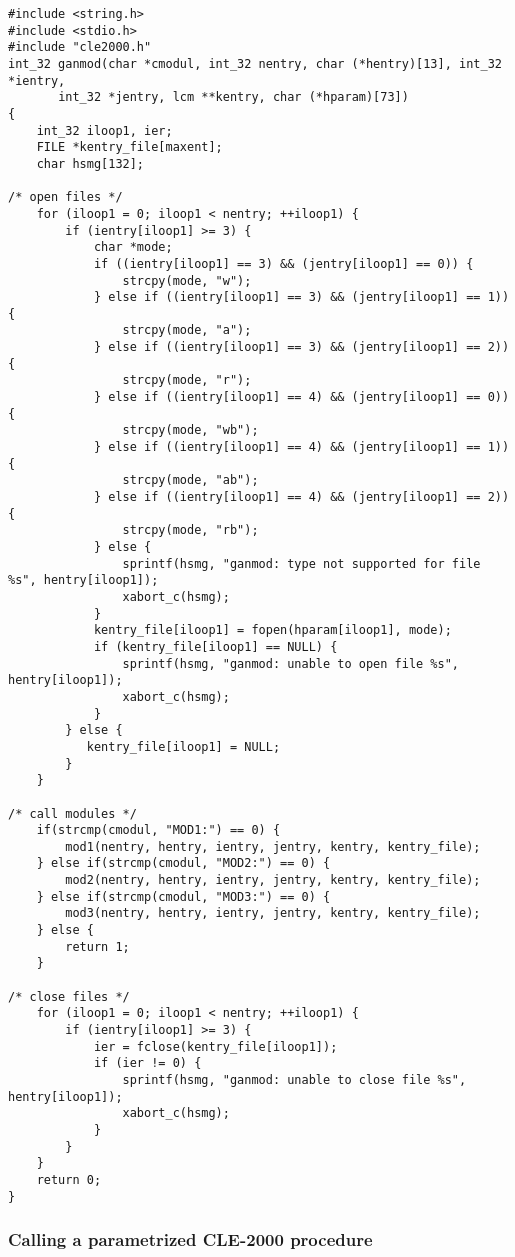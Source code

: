 \begin{verbatim}
#include <string.h>
#include <stdio.h>
#include "cle2000.h"
int_32 ganmod(char *cmodul, int_32 nentry, char (*hentry)[13], int_32 *ientry,
       int_32 *jentry, lcm **kentry, char (*hparam)[73])
{
    int_32 iloop1, ier;
    FILE *kentry_file[maxent];
    char hsmg[132];

/* open files */
    for (iloop1 = 0; iloop1 < nentry; ++iloop1) {
        if (ientry[iloop1] >= 3) {
            char *mode;
            if ((ientry[iloop1] == 3) && (jentry[iloop1] == 0)) {
                strcpy(mode, "w");
            } else if ((ientry[iloop1] == 3) && (jentry[iloop1] == 1)) {
                strcpy(mode, "a");
            } else if ((ientry[iloop1] == 3) && (jentry[iloop1] == 2)) {
                strcpy(mode, "r");
            } else if ((ientry[iloop1] == 4) && (jentry[iloop1] == 0)) {
                strcpy(mode, "wb");
            } else if ((ientry[iloop1] == 4) && (jentry[iloop1] == 1)) {
                strcpy(mode, "ab");
            } else if ((ientry[iloop1] == 4) && (jentry[iloop1] == 2)) {
                strcpy(mode, "rb");
            } else {
                sprintf(hsmg, "ganmod: type not supported for file %s", hentry[iloop1]);
                xabort_c(hsmg);
            }
            kentry_file[iloop1] = fopen(hparam[iloop1], mode);
            if (kentry_file[iloop1] == NULL) {
                sprintf(hsmg, "ganmod: unable to open file %s", hentry[iloop1]);
                xabort_c(hsmg);
            }
        } else {
           kentry_file[iloop1] = NULL;
        }
    }
 
/* call modules */
    if(strcmp(cmodul, "MOD1:") == 0) {
        mod1(nentry, hentry, ientry, jentry, kentry, kentry_file);
    } else if(strcmp(cmodul, "MOD2:") == 0) {
        mod2(nentry, hentry, ientry, jentry, kentry, kentry_file);
    } else if(strcmp(cmodul, "MOD3:") == 0) {
        mod3(nentry, hentry, ientry, jentry, kentry, kentry_file);
    } else {
        return 1;
    }

/* close files */
    for (iloop1 = 0; iloop1 < nentry; ++iloop1) {
        if (ientry[iloop1] >= 3) {
            ier = fclose(kentry_file[iloop1]);
            if (ier != 0) {
                sprintf(hsmg, "ganmod: unable to close file %s", hentry[iloop1]);
                xabort_c(hsmg);
            }
        }
    }
    return 0;
}
\end{verbatim}

\subsubsection {Calling a parametrized CLE-2000 procedure}

